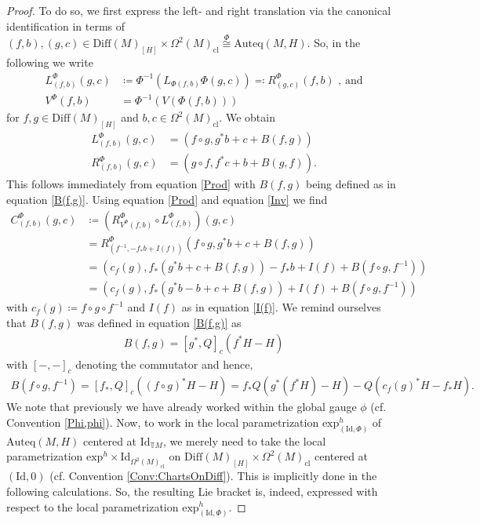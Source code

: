 \documentclass[12pt,a4paper]{article}
\theoremstyle{plain}
\theoremstyle{definition}
\newcommand{\Forms}[1]{\Omega^{#1}(M)}
\newcommand{\ClForms}[1]{\Forms{#1}_{\mathrm{cl}}}
\newcommand{\SDiff}{\mathrm{Diff}(M)_{[H]}}
\newcommand{\Auteq}{\mathrm{Auteq}(M,H)}
\newcommand{\exh}{\mathrm{exp}^h}
\newcommand{\Id}{\mathrm{Id}}
\newcommand{\GenTM}{\mathbb TM}
\begin{document}
\begin{proof}
To do so, we first express the left- and right translation via the canonical identification in terms of $(f,b),(g,c)\in \SDiff\times \ClForms{2}\stackrel{\Phi}{\cong}\Auteq$.
So, in the following we write 
\begin{align*}
    L^\Phi_{(f,b)}(g,c)&\coloneqq \Phi^{-1}(L_{\Phi(f,b)}\Phi(g,c))\eqqcolon R^\Phi_{(g,c)}(f,b) \text{ , and}\\
    V^\Phi(f,b)&=\Phi^{-1}(V(\Phi(f,b)))
\end{align*}
for $f,g\in \SDiff$ and $b,c\in \ClForms{2}$.
We obtain
\begin{align*}
    L^\Phi_{(f,b)}(g,c)&=(f\circ g,g^*b+c+B(f,g))\\
    R^\Phi_{(f,b)}(g,c)&=(g\circ f,f^*c+b+B(g,f)).
\end{align*}
This follows immediately from equation \eqref{Prod} with $B(f,g)$ being defined as in equation \eqref{B(f,g)}.
Using equation \eqref{Prod} and equation \eqref{Inv} we find
\begin{align*}
    C^\Phi_{(f,b)}(g,c)&\coloneqq (R^\Phi_{V^\Phi(f,b)}\circ L^\Phi_{(f,b)})(g,c)\\
    &=R^\Phi_{(f^{-1},-f_*b+I(f))}(f\circ g, g^*b+c+B(f,g))\\
    &=(c_f(g),f_*(g^*b+c+B(f,g))-f_*b+I(f)+B(f\circ g,f^{-1}))\\
    &=(c_f(g),f_*(g^*b-b+c+B(f,g))+I(f)+B(f\circ g,f^{-1}))
\end{align*}
with $c_f(g)\coloneqq f\circ g\circ f^{-1}$ and $I(f)$ as in equation \eqref{I(f)}.
We remind ourselves that $B(f,g)$ was defined in equation \eqref{B(f,g)} as
\begin{align*}
    B(f,g)=[g^*,Q]_c(f^*H-H)
\end{align*}
with $[-,-]_c$ denoting the commutator and hence,
\begin{align*}
    B(f\circ g,f^{-1})=[f_*,Q]_c((f\circ g)^*H-H)=f_*Q(g^*(f^*H)-H)-Q(c_f(g)^*H-f_*H).
\end{align*}
We note that previously we have already worked within the global gauge $\phi$ (cf. Convention \ref{Phi,phi}). Now, to work in the local parametrization $\exh_{(\Id,\Phi)}$ of $\Auteq$ centered at $\mathrm{Id}_{\GenTM}$, we merely need to take the local parametrization $\exh\times \mathrm{Id}_{\ClForms{2}}$ on $\SDiff\times \ClForms{2}$ centered at $(\Id,0)$ (cf. Convention \ref{Conv:ChartsOnDiff}). This is implicitly done in the following calculations. So, the resulting Lie bracket is, indeed, expressed with respect to the local parametrization $\exh_{(\Id,\Phi)}$. 


\end{proof}
\end{document}
